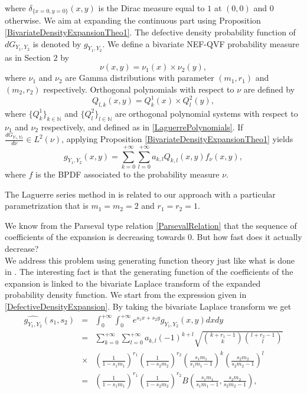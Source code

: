 where $\delta_{\{x=0,y=0\}}(x,y)$ is the Dirac measure equal to $1$ at $(0,0)$ and $0$ otherwise. We aim at expanding the continuous part using Proposition \ref{BivariateDensityExpansionTheo1}. The defective density probability function of $dG_{Y_{1},Y_{2}}$ is denoted by $g_{Y_{1},Y_{2}}$. We define a bivariate NEF-QVF probability measure as in Section $2$ by
\begin{equation}
\nu(x,y)=\nu_{1}(x)\times\nu_{2}(y),
\end{equation}
where $\nu_{1}$ and $\nu_{2}$ are Gamma distributions with parameter $(m_{1},r_{1})$ and $(m_{2},r_{2})$ respectively. Orthogonal polynomials with respect to $\nu$ are defined by 
\begin{equation}
Q_{l,k}(x,y)=Q^{1}_{k}(x)\times Q^{2}_{l}(y),
\end{equation}
where $\{Q^{1}_{k}\}_{k\in\mathbb{N}}$ and $\{Q^{2}_{l}\}_{l\in\mathbb{N}}$ are orthogonal polynomial systems with respect to $\nu_{1}$ and $\nu_{2}$ respectively, and defined as in \eqref{LaguerrePolynomials}. If $\frac{dG_{Y_{1},Y_{2}}}{d\nu}\in L^{2}(\nu)$, applying Proposition \ref{BivariateDensityExpansionTheo1} yields
\begin{equation}\label{DefectiveDensityExpansion}
g_{Y_{1},Y_{2}}(x,y)=\sum_{k=0}^{+\infty}\sum_{l=0}^{+\infty}a_{k,l} Q_{k,l}(x,y)f_{\nu}(x,y),
\end{equation} 
where $f$ is the BPDF associated to the probability measure $\nu$.
\begin{Rk}
The Laguerre series method in \citet{AbChWh98} is related to our approach with a particular parametrization that is $m_{1}=m_{2}=2$ and $r_{1}=r_{2}=1$.
\end{Rk}
We know from the Parseval type relation \eqref{ParsevalRelation} that the sequence of coefficients of the expansion is decreasing towards $0$. But how fast does it actually decrease?\\
We address this problem using generating function theory just like what is done in \citet{AbChWh98}. The interesting fact is that the generating function of the coefficients of the expansion is linked to the bivariate Laplace transform of the expanded probability density function. We start from the expression given in \eqref{DefectiveDensityExpansion}. By taking the bivariate Laplace transform we get
\begin{eqnarray}\label{LaplaceTransformToGenFunction}
\widehat{g_{Y_{1},Y_{2}}}(s_{1},s_{2})&=&\int_{0}^{+\infty}\int_{0}^{+\infty}e^{s_{1}x+s_{2}y}g_{Y_{1},Y_{2}}(x,y)
dxdy\nonumber\\
&=&\sum_{k=0}^{+\infty}\sum_{l=0}^{+\infty}a_{k,l}
(-1)^{k+l}\sqrt{\binom{k+r_{1}-1}{k}\binom{l+r_{2}-1}{l}}\nonumber\\
&\times&\left(\frac{1}{1-s_{1}m_{1}}\right)^{r_{1}}\left(\frac{1}{1-s_{2}m_{2}}\right)^{r_{2}}\left(\frac{s_{1}m_{1}}{s_{1}m_{1}-1}\right)^{k}\left(\frac{s_{2}m_{2}}{s_{2}m_{2}-1}\right)^{l}\nonumber\\
&=&\left(\frac{1}{1-s_{1}m_{1}}\right)^{r_{1}}\left(\frac{1}{1-s_{2}m_{2}}\right)^{r_{2}}B\left(\frac{s_{1}m_{1}}{s_{1}m_{1}-1},\frac{s_{2}m_{2}}{s_{2}m_{2}-1}\right),
\end{eqnarray}
